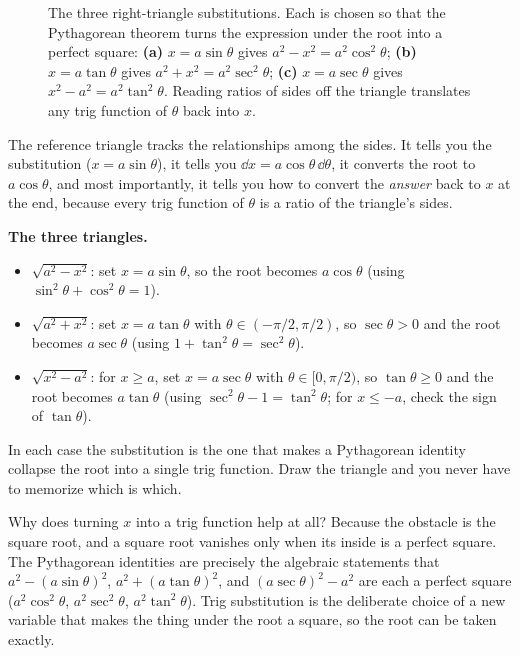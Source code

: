 \begin{figure}[htbp]
\begin{tikzpicture}[scale=0.9]
\end{tikzpicture}
\caption{The three right-triangle substitutions. Each is chosen so that the Pythagorean theorem turns the expression under the root into a perfect square: \textbf{(a)} $x=a\sin\theta$ gives $a^2-x^2 = a^2\cos^2\theta$; \textbf{(b)} $x=a\tan\theta$ gives $a^2+x^2 = a^2\sec^2\theta$; \textbf{(c)} $x=a\sec\theta$ gives $x^2-a^2 = a^2\tan^2\theta$. Reading ratios of sides off the triangle translates any trig function of $\theta$ back into $x$.}
\label{ch24:fig-triangle}
\end{figure}

The reference triangle tracks the relationships among the sides. It tells
you the substitution ($x = a\sin\theta$), it tells you $\dd x = a\cos\theta\,
\dd\theta$, it converts the root to $a\cos\theta$, and most importantly, it tells
you how to convert the \emph{answer} back to $x$ at the end, because every trig
function of $\theta$ is a ratio of the triangle's sides.

\begin{focusbox}
\textbf{The three triangles.}
\begin{itemize}
\item $\sqrt{a^2 - x^2}$: set $x = a\sin\theta$, so the root becomes $a\cos\theta$
   (using $\sin^2\theta + \cos^2\theta = 1$).
\item $\sqrt{a^2 + x^2}$: set $x = a\tan\theta$ with $\theta\in(-\pi/2,\pi/2)$, so
   $\sec\theta > 0$ and the root becomes $a\sec\theta$ (using $1 + \tan^2\theta = \sec^2\theta$).
\item $\sqrt{x^2 - a^2}$: for $x \ge a$, set $x = a\sec\theta$ with
   $\theta\in[0,\pi/2)$, so $\tan\theta\ge 0$ and the root becomes $a\tan\theta$
   (using $\sec^2\theta - 1 = \tan^2\theta$; for $x\le -a$, check the sign of $\tan\theta$).
\end{itemize}
In each case the substitution is the one that makes a Pythagorean identity
collapse the root into a single trig function. Draw the triangle and you never
have to memorize which is which.
\end{focusbox}

\begin{whybox}
Why does turning $x$ into a trig function help at all? Because the obstacle is
the square root, and a square root vanishes only when its inside is a perfect
square. The Pythagorean identities are precisely the algebraic statements that
$a^2 - (a\sin\theta)^2$, $a^2 + (a\tan\theta)^2$, and $(a\sec\theta)^2 - a^2$
are each a perfect square ($a^2\cos^2\theta$, $a^2\sec^2\theta$,
$a^2\tan^2\theta$). Trig substitution is the deliberate choice of a new
variable that makes the thing under the root a square, so the root can be
taken exactly.
\end{whybox}

